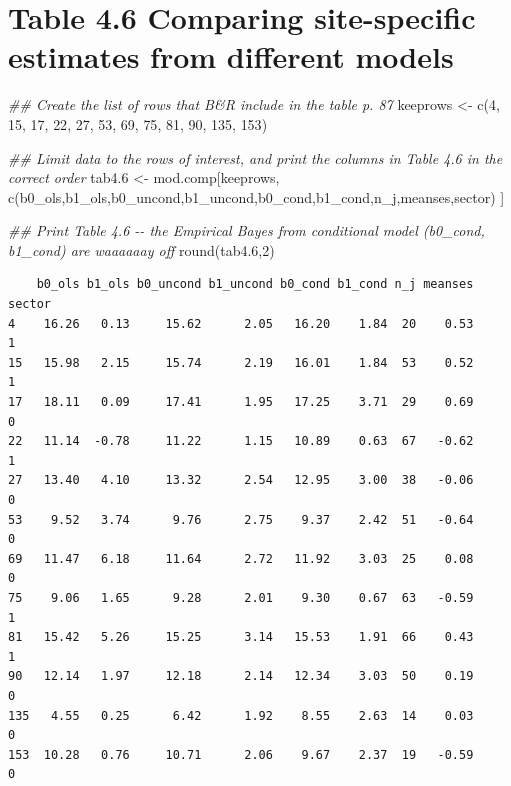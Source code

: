 \documentclass[
  letterpaper,
  DIV=11,
  numbers=noendperiod]{scrreprt}
\newenvironment{Shaded}{}{}
\newcommand{\DecValTok}[1]{\textcolor[rgb]{0.25,0.63,0.44}{#1}}
\newcommand{\DocumentationTok}[1]{\textcolor[rgb]{0.73,0.13,0.13}{\textit{#1}}}
\newcommand{\FloatTok}[1]{\textcolor[rgb]{0.25,0.63,0.44}{#1}}
\newcommand{\FunctionTok}[1]{\textcolor[rgb]{0.02,0.16,0.49}{#1}}
\newcommand{\NormalTok}[1]{#1}
\newcommand{\OtherTok}[1]{\textcolor[rgb]{0.00,0.44,0.13}{#1}}
\newcommand{\StringTok}[1]{\textcolor[rgb]{0.25,0.44,0.63}{#1}}
\begin{document}
\section{Table 4.6 Comparing site-specific estimates from different
models}\label{table-4.6-comparing-site-specific-estimates-from-different-models}

\begin{Shaded}
\begin{Highlighting}[]
\DocumentationTok{\#\# Create the list of rows that B\&R include in the table p. 87}
\NormalTok{keeprows }\OtherTok{\textless{}{-}} \FunctionTok{c}\NormalTok{(}\DecValTok{4}\NormalTok{, }\DecValTok{15}\NormalTok{, }\DecValTok{17}\NormalTok{, }\DecValTok{22}\NormalTok{, }\DecValTok{27}\NormalTok{, }\DecValTok{53}\NormalTok{, }\DecValTok{69}\NormalTok{, }\DecValTok{75}\NormalTok{, }\DecValTok{81}\NormalTok{, }\DecValTok{90}\NormalTok{, }\DecValTok{135}\NormalTok{, }\DecValTok{153}\NormalTok{)}

\DocumentationTok{\#\# Limit data to the rows of interest, and print the columns in Table 4.6 in the correct order}
\NormalTok{tab4}\FloatTok{.6} \OtherTok{\textless{}{-}}\NormalTok{ mod.comp[keeprows, }\FunctionTok{c}\NormalTok{(}\StringTok{\textquotesingle{}b0\_ols\textquotesingle{}}\NormalTok{,}\StringTok{\textquotesingle{}b1\_ols\textquotesingle{}}\NormalTok{,}\StringTok{\textquotesingle{}b0\_uncond\textquotesingle{}}\NormalTok{,}\StringTok{\textquotesingle{}b1\_uncond\textquotesingle{}}\NormalTok{,}\StringTok{\textquotesingle{}b0\_cond\textquotesingle{}}\NormalTok{,}\StringTok{\textquotesingle{}b1\_cond\textquotesingle{}}\NormalTok{,}\StringTok{\textquotesingle{}n\_j\textquotesingle{}}\NormalTok{,}\StringTok{\textquotesingle{}meanses\textquotesingle{}}\NormalTok{,}\StringTok{\textquotesingle{}sector\textquotesingle{}}\NormalTok{) ]}


\DocumentationTok{\#\# Print Table 4.6 {-}{-} the Empirical Bayes from conditional model (b0\_cond, b1\_cond) are waaaaaay off}
\FunctionTok{round}\NormalTok{(tab4}\FloatTok{.6}\NormalTok{,}\DecValTok{2}\NormalTok{)}
\end{Highlighting}
\end{Shaded}

\begin{verbatim}
    b0_ols b1_ols b0_uncond b1_uncond b0_cond b1_cond n_j meanses sector
4    16.26   0.13     15.62      2.05   16.20    1.84  20    0.53      1
15   15.98   2.15     15.74      2.19   16.01    1.84  53    0.52      1
17   18.11   0.09     17.41      1.95   17.25    3.71  29    0.69      0
22   11.14  -0.78     11.22      1.15   10.89    0.63  67   -0.62      1
27   13.40   4.10     13.32      2.54   12.95    3.00  38   -0.06      0
53    9.52   3.74      9.76      2.75    9.37    2.42  51   -0.64      0
69   11.47   6.18     11.64      2.72   11.92    3.03  25    0.08      0
75    9.06   1.65      9.28      2.01    9.30    0.67  63   -0.59      1
81   15.42   5.26     15.25      3.14   15.53    1.91  66    0.43      1
90   12.14   1.97     12.18      2.14   12.34    3.03  50    0.19      0
135   4.55   0.25      6.42      1.92    8.55    2.63  14    0.03      0
153  10.28   0.76     10.71      2.06    9.67    2.37  19   -0.59      0
\end{verbatim}
\end{document}
